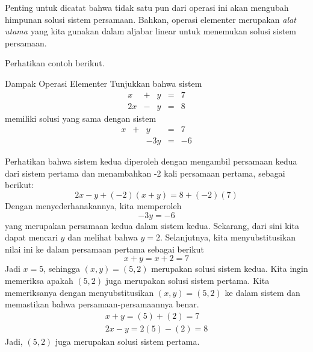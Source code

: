 Penting untuk dicatat bahwa tidak satu pun dari operasi ini akan
mengubah himpunan solusi sistem persamaan. Bahkan, operasi elementer merupakan {\em alat utama \em}yang kita gunakan dalam aljabar linear untuk menemukan solusi sistem persamaan.

Perhatikan contoh berikut.

\begin{example}{Dampak Operasi Elementer}\label{exa:effectsofelementaryoperation}
\label{example:effectsofelementaryoperation}
Tunjukkan bahwa sistem
\begin{equation*}
\begin{array}{cccccc}
x&+&y&=&7 \\
2x&-&y&=&8
\end{array}
\end{equation*}
memiliki solusi yang sama dengan sistem
\begin{equation*}
\begin{array}{cccccc}
x&+&y&=&7 \\
&&-3y&=&-6
\end{array}
\end{equation*}
\end{example}

\begin{solution}
Perhatikan bahwa sistem kedua diperoleh dengan mengambil persamaan kedua dari sistem pertama
dan menambahkan -2 kali persamaan pertama, sebagai berikut:
\begin{equation*}
2x-y + (-2)(x+y) = 8 + (-2)(7)
\end{equation*}
Dengan menyederhanakannya, kita memperoleh
\begin{equation*}
-3y=-6
\end{equation*}
yang merupakan persamaan kedua dalam sistem kedua.
Sekarang, dari sini kita dapat mencari $y$ dan melihat bahwa $y=2$. Selanjutnya, kita menyubstitusikan nilai ini ke dalam persamaan pertama sebagai berikut \:
\begin{equation*}
x+y=x+2=7
\end{equation*}
Jadi $x=5$, sehingga $\left( x,y\right) = \left(5,2 \right)$ merupakan solusi sistem kedua.
Kita ingin memeriksa apakah $\left(5,2 \right)$ juga merupakan solusi sistem pertama. Kita memeriksanya dengan menyubstitusikan $\left(x, y \right) = \left(5,2 \right)$
ke dalam sistem dan memastikan bahwa persamaan-persamaannya benar.
\begin{equation*}
\begin{array}{c}
x+y = \left(5 \right)+ \left( 2 \right) = 7 \\
2x-y= 2 \left(5 \right) - \left( 2 \right) = 8
\end{array}
\end{equation*}
Jadi, $\left(5,2 \right)$ juga merupakan solusi sistem pertama.
\end{solution}

